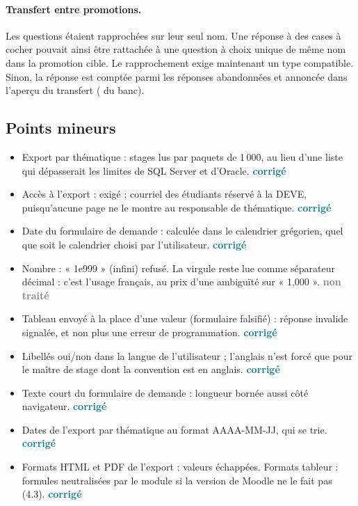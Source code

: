 \documentclass[11pt,a4paper]{article}
\newcommand{\grav}[1]{\textbf{\textcolor{#1}{\textbullet}}}
\newcommand{\maj}{\grav{orange}}
\newcommand{\ok}{\textcolor{teal}{\textbf{corrigé}}}
\newcommand{\non}{\textcolor{gray}{\textbf{non traité}}}
\begin{document}
\paragraph{\maj{} Transfert entre promotions.} Les questions étaient rapprochées sur leur seul
nom. Une réponse à des cases à cocher pouvait ainsi être rattachée à une question à choix unique
de même nom dans la promotion cible. Le rapprochement exige maintenant un type compatible.
Sinon, la réponse est comptée parmi les réponses abandonnées et annoncée dans l'aperçu du
transfert ( du banc).

\subsection{Points mineurs}\label{sec:mineures}

\begin{itemize}
  \item Export par thématique : stages lus par paquets de 1\,000, au lieu d'une liste 
    qui dépasserait les limites de SQL Server et d'Oracle. \ok
  \item Accès à l'export :  exigé ; courriel des étudiants réservé à la DEVE,
    puisqu'aucune page ne le montre au responsable de thématique. \ok
  \item Date du formulaire de demande : calculée dans le calendrier grégorien, quel que soit le
    calendrier choisi par l'utilisateur. \ok
  \item Nombre : « 1e999 » (infini) refusé. La virgule reste lue comme séparateur décimal : c'est
    l'usage français, au prix d'une ambiguïté sur « 1,000 ». \non
  \item Tableau envoyé à la place d'une valeur (formulaire falsifié) : réponse invalide signalée,
    et non plus une erreur de programmation. \ok
  \item Libellés oui/non dans la langue de l'utilisateur ; l'anglais n'est forcé que pour le
    maître de stage dont la convention est en anglais. \ok
  \item Texte court du formulaire de demande : longueur bornée aussi côté navigateur. \ok
  \item Dates de l'export par thématique au format AAAA-MM-JJ, qui se trie. \ok
  \item Formats HTML et PDF de l'export : valeurs échappées. Formats tableur : formules
    neutralisées par le module si la version de Moodle ne le fait pas (4.3). \ok
\end{itemize}
\end{document}
